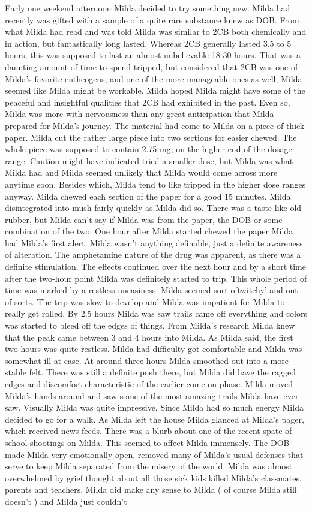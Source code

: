 \documentclass[12pt]{book}
\begin{document}
Early one weekend afternoon Milda decided to try something new. Milda had recently was gifted with a sample of a quite rare substance knew as DOB. From what Milda had read and was told Milda was similar to 2CB both chemically and in action, but fantastically long lasted. Whereas 2CB generally lasted 3.5 to 5 hours, this was supposed to last an almost unbelievable 18-30 hours. That was a daunting amount of time to spend tripped, but considered that 2CB was one of Milda's favorite entheogens, and one of the more manageable ones as well, Milda seemed like Milda might be workable. Milda hoped Milda might have some of the peaceful and insightful qualities that 2CB had exhibited in the past. Even so, Milda was more with nervousness than any great anticipation that Milda prepared for Milda's journey. The material had come to Milda on a piece of thick paper. Milda cut the rather large piece into two sections for easier chewed. The whole piece was supposed to contain 2.75 mg, on the higher end of the dosage range. Caution might have indicated tried a smaller dose, but Milda was what Milda had and Milda seemed unlikely that Milda would come across more anytime soon. Besides which, Milda tend to like tripped in the higher dose ranges anyway. Milda chewed each section of the paper for a good 15 minutes. Milda disintegrated into mush fairly quickly as Milda did so. There was a taste like old rubber, but Milda can't say if Milda was from the paper, the DOB or some combination of the two. One hour after Milda started chewed the paper Milda had Milda's first alert. Milda wasn't anything definable, just a definite awareness of alteration. The amphetamine nature of the drug was apparent, as there was a definite stimulation. The effects continued over the next hour and by a short time after the two-hour point Milda was definitely started to trip. This whole period of time was marked by a restless uneasiness. Milda seemed sort oftwitchy' and out of sorts. The trip was slow to develop and Milda was impatient for Milda to really get rolled. By 2.5 hours Milda was saw trails came off everything and colors was started to bleed off the edges of things. From Milda's research Milda knew that the peak came between 3 and 4 hours into Milda. As Milda said, the first two hours was quite restless. Milda had difficulty got comfortable and Milda was somewhat ill at ease. At around three hours Milda smoothed out into a more stable felt. There was still a definite push there, but Milda did have the ragged edges and discomfort characteristic of the earlier come on phase. Milda moved Milda's hands around and saw some of the most amazing trails Milda have ever saw. Visually Milda was quite impressive. Since Milda had so much energy Milda decided to go for a walk. As Milda left the house Milda glanced at Milda's pager, which received news feeds. There was a blurb about one of the recent spate of school shootings on Milda. This seemed to affect Milda immensely. The DOB made Milda very emotionally open, removed many of Milda's usual defenses that serve to keep Milda separated from the misery of the world. Milda was almost overwhelmed by grief thought about all those sick kids killed Milda's classmates, parents and teachers. Milda did make any sense to Milda ( of course Milda still doesn't ) and Milda just couldn't 
\end{document}
